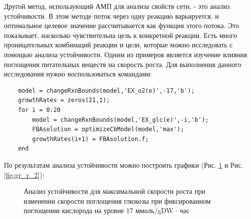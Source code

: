 \documentclass[a4paper, 12pt]{article}
\begin{document}
Другой метод, использующий АМП для анализа свойств сети, - это анализ устойчивости. В этом методе поток через одну реакцию варьируется, и оптимальное целевое значение рассчитывается как функция этого потока. Это показывает, насколько чувствительна цель к конкретной реакции. Есть много проницательных комбинаций реакции и цели, которые можно исследовать с помощью анализа устойчивости. Одним из примеров является изучение влияния поглощения питательных веществ на скорость роста. Для выполнения данного исследования нужно воспользоваться командами:
\begin{lstlisting}
    model = changeRxnBounds(model,'EX_o2(e)',-17,'b');
    growthRates = zeros(21,1);
    for i = 0:20
        model = changeRxnBounds(model,'EX_glc(e)',-i,'b');
        FBAsolution = optimizeCbModel(model,'max');
        growthRates(i+1) = FBAsolution.f;
    end
\end{lstlisting}

По результатам анализа устойчивости можно построить графики (Рис. \ref{fig:gr_r_1} и Рис. \ref{fig:gr_r_2}):

\begin{figure}[H]
    \caption{Анализ устойчивости для максимальной скорости роста при изменении скорости поглощения глюкозы при фиксированном поглощении кислорода на уровне 17 ммоль/gDW $\cdot$ час}
    \label{fig:gr_r_1}
\end{figure}
\end{document}
